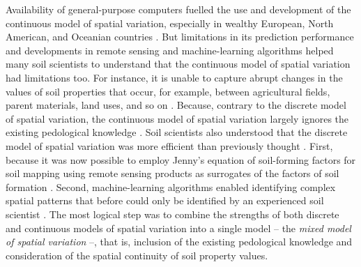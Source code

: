 Availability of general-purpose computers fuelled the use and development of the continuous model of
spatial variation, especially in wealthy European, North American, and Oceanian countries
\cite{HeuvelinkEtAl2001,McBratneyEtAl2003,ScullEtAl2003}. But limitations in its prediction
performance and developments in remote sensing and machine-learning algorithms helped many soil
scientists to understand that the continuous model of spatial variation had limitations too. For
instance, it is unable to capture abrupt changes in the values of soil properties that occur, for
example, between agricultural fields, parent materials, land uses, and so on
\cite{SteinEtAl1988,VoltzEtAl1990}. Because, contrary to the discrete model of spatial variation, the
continuous model of spatial variation largely ignores the existing pedological knowledge
\cite{Grunwald2009,Lark2012}. Soil scientists also understood that the discrete model of spatial
variation was more efficient than previously thought \cite{BregtEtAl1987}. First, because it was now
possible to employ Jenny's equation of soil-forming factors for soil mapping using remote sensing
products as surrogates of the factors of soil formation \cite{MooreEtAl1993}. Second, machine-learning
algorithms enabled identifying complex spatial patterns that before could only be identified by an
experienced soil scientist \cite{McKenzieEtAl1999}. The most logical step was to combine the
strengths of both discrete and continuous models of spatial variation into a single model -- the
\emph{mixed model of spatial variation} --, that is, inclusion of the existing pedological
knowledge and consideration of the spatial continuity of soil property values.

